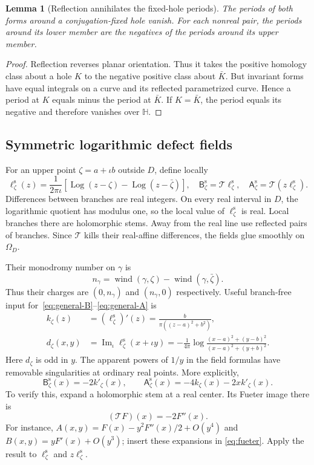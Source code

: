 \documentclass[11pt,a4paper]{article}
\numberwithin{equation}{section}
\newtheorem{lemma}[theorem]{Lemma}
\theoremstyle{definition}
\theoremstyle{remark}
\newcommand{\HH}{\mathbb H}
\newcommand{\T}{\mathcal T}
\newcommand{\wind}{\operatorname{wind}}
\newcommand{\Ima}{\operatorname{Im}_{\iota}}
\newcommand{\Asym}{\mathsf A^{\mathrm s}}
\newcommand{\Bsym}{\mathsf B^{\mathrm s}}
\DeclareMathOperator{\Log}{Log}
\begin{document}
\begin{lemma}[Reflection annihilates the fixed-hole periods]
\label{lem:reflection-periods}
The periods of both forms around a conjugation-fixed hole vanish.
For each nonreal pair, the periods around its lower member are the
negatives of the periods around its upper member.
\end{lemma}
\begin{proof}
Reflection reverses planar orientation. Thus it takes the positive
homology class about a hole $K$ to the negative positive class about
$\bar K$. But invariant forms have equal integrals on a curve and
its reflected parametrized curve. Hence a period at $K$ equals minus
the period at $\bar K$. If $K=\bar K$, the period equals its negative
and therefore vanishes over $\HH$.
\end{proof}

\subsection{Symmetric logarithmic defect fields}
For an upper point $\zeta=a+\iota b$ outside $D$, define locally
\begin{equation}
 \ell^{\mathrm s}_\zeta(z)=\frac{1}{2\pi\iota}
     \left[\Log(z-\zeta)-\Log(z-\bar\zeta)\right],
 \quad
 \Bsym_\zeta=\T\ell^{\mathrm s}_\zeta,
 \quad
 \Asym_\zeta=\T(z\ell^{\mathrm s}_\zeta).
 \label{eq:sym-defects}
\end{equation}
Differences between branches are real integers. On every real interval
in $D$, the logarithmic quotient has modulus one, so the local value of
$\ell^{\mathrm s}_\zeta$ is real. Local branches there are holomorphic
stems. Away from the real line use reflected pairs of branches. Since
$\T$ kills their real-affine differences, the fields glue smoothly on
$\Omega_D$.

Their monodromy number on $\gamma$ is
\[
 n_\gamma=\wind(\gamma,\zeta)-\wind(\gamma,\bar\zeta).
\]
Thus their charges are $(0,n_\gamma)$ and $(n_\gamma,0)$ respectively.
Useful branch-free input for~\eqref{eq:general-B}--\eqref{eq:general-A} is
\begin{align}
 k_\zeta(z)&=(\ell^{\mathrm s}_\zeta)'(z)
       =\frac{b}{\pi((z-a)^2+b^2)},\label{eq:sym-k}\\
 d_\zeta(x,y)&=\Ima\ell^{\mathrm s}_\zeta(x+\iota y)
   =-\frac1{4\pi}\log
       \frac{(x-a)^2+(y-b)^2}{(x-a)^2+(y+b)^2}.
 \label{eq:sym-d}
\end{align}
Here $d_\zeta$ is odd in $y$. The apparent powers of $1/y$ in the
field formulas have removable singularities at ordinary real points.
More explicitly,
\begin{equation}
 \Bsym_\zeta(x)=-2k'_\zeta(x),\qquad
 \Asym_\zeta(x)=-4k_\zeta(x)-2xk'_\zeta(x).
 \label{eq:real-limits}
\end{equation}
To verify this, expand a holomorphic stem at a real center. Its Fueter
image there is
\begin{equation}
 (\T F)(x)=-2F''(x).
 \label{eq:real-value}
\end{equation}
For instance, $A(x,y)=F(x)-y^2F''(x)/2+O(y^4)$ and
$B(x,y)=yF'(x)+O(y^3)$; insert these expansions in
\eqref{eq:fueter}. Apply the result to $\ell^{\mathrm s}_\zeta$ and
$z\ell^{\mathrm s}_\zeta$.
\end{document}
